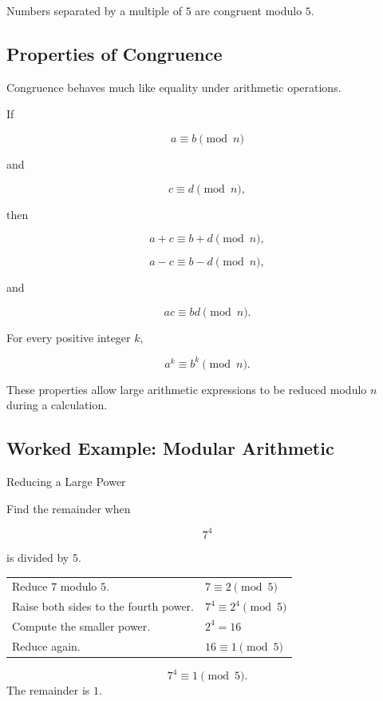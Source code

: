 Numbers separated by a multiple of \(5\) are congruent modulo \(5\).

\subsection{Properties of Congruence}
\label{subsec:congruence-properties}

Congruence behaves much like equality under arithmetic operations.

If

\[ a\equiv b\pmod n \]

and

\[ c\equiv d\pmod n, \]

then

\[ a+c\equiv b+d\pmod n, \]

\[ a-c\equiv b-d\pmod n, \]

and

\[ ac\equiv bd\pmod n. \]

For every positive integer \(k\),

\[ a^k\equiv b^k\pmod n. \]

These properties allow large arithmetic expressions to be reduced modulo
\(n\) during a calculation.

\subsection{Worked Example: Modular Arithmetic}
\label{subsec:worked-modular-arithmetic}

\begin{workedexamplebox}{Reducing a Large Power}

Find the remainder when

\[ 7^4 \]

is divided by \(5\).

\begin{tabularx}{\textwidth}{@{}>{\raggedright\arraybackslash}p{}X@{}}
Reduce \(7\) modulo \(5\). &
\(7\equiv2\pmod5\)\\
Raise both sides to the fourth power. &
\(7^4\equiv2^4\pmod5\)\\
Compute the smaller power. &
\(2^4=16\)\\
Reduce again. &
\(16\equiv1\pmod5\)
\end{tabularx}

\begin{answerbox}
\[ \boxed{7^4\equiv1\pmod5.} \]
The remainder is \(1\).
\end{answerbox}
\end{workedexamplebox}

